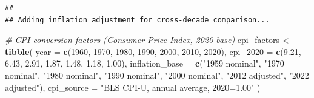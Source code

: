 \documentclass[
]{article}
\newenvironment{Shaded}{\begin{snugshade}}{\end{snugshade}}
\newcommand{\AttributeTok}[1]{\textcolor[rgb]{0.13,0.29,0.53}{#1}}
\newcommand{\CommentTok}[1]{\textcolor[rgb]{0.56,0.35,0.01}{\textit{#1}}}
\newcommand{\DecValTok}[1]{\textcolor[rgb]{0.00,0.00,0.81}{#1}}
\newcommand{\FloatTok}[1]{\textcolor[rgb]{0.00,0.00,0.81}{#1}}
\newcommand{\FunctionTok}[1]{\textcolor[rgb]{0.13,0.29,0.53}{\textbf{#1}}}
\newcommand{\NormalTok}[1]{#1}
\newcommand{\OtherTok}[1]{\textcolor[rgb]{0.56,0.35,0.01}{#1}}
\newcommand{\StringTok}[1]{\textcolor[rgb]{0.31,0.60,0.02}{#1}}
\begin{document}
\begin{verbatim}
## 
## Adding inflation adjustment for cross-decade comparison...
\end{verbatim}

\begin{Shaded}
\begin{Highlighting}[]
\CommentTok{\# CPI conversion factors (Consumer Price Index, 2020 base)}
\NormalTok{cpi\_factors }\OtherTok{\textless{}{-}} \FunctionTok{tibble}\NormalTok{(}
  \AttributeTok{year =} \FunctionTok{c}\NormalTok{(}\DecValTok{1960}\NormalTok{, }\DecValTok{1970}\NormalTok{, }\DecValTok{1980}\NormalTok{, }\DecValTok{1990}\NormalTok{, }\DecValTok{2000}\NormalTok{, }\DecValTok{2010}\NormalTok{, }\DecValTok{2020}\NormalTok{),}
  \AttributeTok{cpi\_2020 =} \FunctionTok{c}\NormalTok{(}\FloatTok{9.21}\NormalTok{, }\FloatTok{6.43}\NormalTok{, }\FloatTok{2.91}\NormalTok{, }\FloatTok{1.87}\NormalTok{, }\FloatTok{1.48}\NormalTok{, }\FloatTok{1.18}\NormalTok{, }\FloatTok{1.00}\NormalTok{),}
  \AttributeTok{inflation\_base =} \FunctionTok{c}\NormalTok{(}\StringTok{"1959 nominal"}\NormalTok{, }\StringTok{"1970 nominal"}\NormalTok{, }\StringTok{"1980 nominal"}\NormalTok{,}
                    \StringTok{"1990 nominal"}\NormalTok{, }\StringTok{"2000 nominal"}\NormalTok{, }\StringTok{"2012 adjusted"}\NormalTok{,}
                    \StringTok{"2022 adjusted"}\NormalTok{),}
  \AttributeTok{cpi\_source =} \StringTok{"BLS CPI{-}U, annual average, 2020=1.00"}
\NormalTok{)}


\end{Highlighting}
\end{Shaded}
\end{document}
